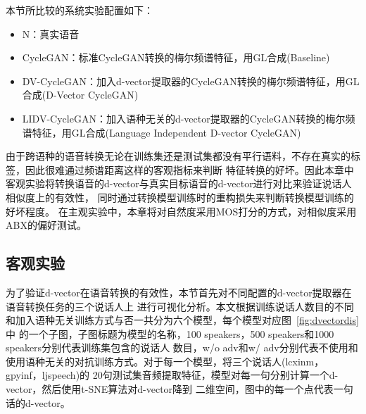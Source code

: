 本节所比较的系统实验配置如下：
\begin{itemize}
    \item N：真实语音
    \item CycleGAN：标准CycleGAN转换的梅尔频谱特征，用GL合成(Baseline)
    \item DV-CycleGAN：加入d-vector提取器的CycleGAN转换的梅尔频谱特征，用GL合成(D-Vector CycleGAN)
    \item LIDV-CycleGAN：加入语种无关的d-vector提取器的CycleGAN转换的梅尔频谱特征，用GL合成(Language Independent D-vector CycleGAN)
\end{itemize}

由于跨语种的语音转换无论在训练集还是测试集都没有平行语料，不存在真实的标签，因此很难通过频谱距离这样的客观指标来判断
特征转换的好坏。因此本章中客观实验将转换语音的d-vector与真实目标语音的d-vector进行对比来验证说话人相似度上的有效性，
同时通过转换模型训练时的重构损失来判断转换模型训练的好坏程度。
在主观实验中，本章将对自然度采用MOS打分的方式，对相似度采用ABX的偏好测试。

\subsection{客观实验}

为了验证d-vector在语音转换的有效性，本节首先对不同配置的d-vector提取器在语音转换任务的三个说话人上
进行可视化分析。本文根据训练说话人数目的不同和加入语种无关训练方式与否一共分为六个模型，每个模型对应图~\ref{fig:dvectordis}中
的一个子图，子图标题为模型的名称，100 speakers，500 speakers和1000 speakers分别代表训练集包含的说话人
数目，w/o adv和w/ adv分别代表不使用和使用语种无关的对抗训练方式。对于每一个模型，将三个说话人(lcxinm，gpyinf，ljspeech)的
20句测试集音频提取特征，模型对每一句分别计算一个d-vector，然后使用t-SNE算法\cite{maaten2008visualizing}对d-vector降到
二维空间，图中的每一个点代表一句话的d-vector。



